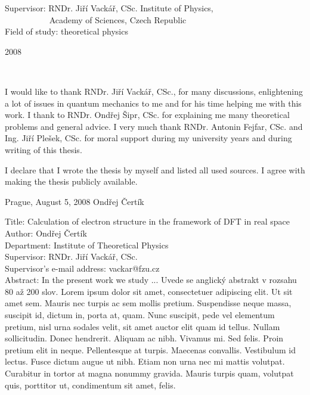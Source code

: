 \documentclass[12pt,notitlepage]{report}
\begin{document}
\begin{titlepage}
\large
\noindent Supervisor: RNDr. Jiří Vackář, CSc. Institute of Physics, \\
\hbox{$\quad\quad\quad\quad\quad$}   Academy of Sciences, Czech Republic
\vspace{1mm}\\
%
\noindent Field of study: theoretical physics
\bigskip
\bigskip
\begin{center}
2008
\end{center}

\end{titlepage}

\normalsize
\setcounter{page}{2}
\ \vspace{10mm}

\noindent I would like to thank RNDr. Jiří Vackář, CSc., for many discussions,
enlightening a lot of issues in quantum mechanics to me and for his time
helping me with this work. I thank to RNDr. Ondřej Šipr, CSc. for explaining me
many theoretical problems and general advice. I very much thank RNDr.  Antonin
Fejfar, CSc. and Ing. Jiří Plešek, CSc. for moral support during my university
years and during writing of this thesis.

\vspace{\fill}
\noindent I declare that I wrote the thesis by myself and listed all used
sources. I agree with making the thesis publicly available.

\bigskip
\noindent Prague, August 5, 2008 \hspace{\fill}Ondřej Čertík\\ %



\newpage %

\noindent
Title: Calculation of electron structure in the framework of DFT in real
space\\
Author: Ondřej Čertík\\
Department: Institute of Theoretical Physics\\
Supervisor: RNDr. Jiří Vackář, CSc.\\
Supervisor's e-mail address: vackar@fzu.cz\\

\noindent Abstract: In the present work we study ... Uvede se anglický abstrakt v rozsahu 80 až 200 slov. Lorem ipsum dolor sit amet, consectetuer adipiscing elit. Ut sit amet sem. Mauris nec turpis ac sem mollis pretium. Suspendisse neque massa, suscipit id, dictum in, porta at, quam. Nunc suscipit, pede vel elementum pretium, nisl urna sodales velit, sit amet auctor elit quam id tellus. Nullam sollicitudin. Donec hendrerit. Aliquam ac nibh. Vivamus mi. Sed felis. Proin pretium elit in neque. Pellentesque at turpis. Maecenas convallis. Vestibulum id lectus. Fusce dictum augue ut nibh. Etiam non urna nec mi mattis volutpat. Curabitur in tortor at magna nonummy gravida. Mauris turpis quam, volutpat quis, porttitor ut, condimentum sit amet, felis. \\
\end{document}
